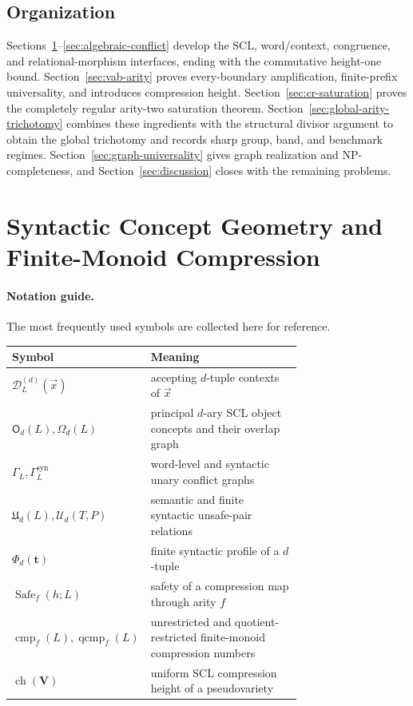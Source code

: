 \documentclass[10pt,a4paper]{article}
\theoremstyle{definition}
\theoremstyle{remark}
\newcommand{\cmp}{\operatorname{cmp}}
\newcommand{\qcmp}{\operatorname{qcmp}}
\newcommand{\D}{\mathcal D}
\newcommand{\Obj}{\mathsf O}
\newcommand{\Om}{\Omega}
\begin{document}
\subsection{Organization}

Sections~\ref{sec:scl-geometry}--\ref{sec:algebraic-conflict} develop the SCL,
word/context, congruence, and relational-morphism interfaces, ending with the
commutative height-one bound.  Section~\ref{sec:vab-arity} proves
every-boundary amplification, finite-prefix universality, and introduces
compression height.  Section~\ref{sec:cr-saturation} proves the completely
regular arity-two saturation theorem.  Section~\ref{sec:global-arity-trichotomy}
combines these ingredients with the structural divisor argument to obtain the
global trichotomy and records sharp group, band, and benchmark regimes.
Section~\ref{sec:graph-universality} gives graph realization and
NP-completeness, and Section~\ref{sec:discussion} closes with the remaining
problems.


\section{Syntactic Concept Geometry and Finite-Monoid Compression}
\label{sec:scl-geometry}

\paragraph{Notation guide.}
The most frequently used symbols are collected here for reference.
\begin{center}
\small
\begin{tabular}{@{}l p{0.72\linewidth}@{}}
\toprule
Symbol & Meaning\\
\midrule
\(\D_L^{(d)}(\vec x)\) & accepting \(d\)-tuple contexts of \(\vec x\)\\
\(\Obj_d(L),\Om_d(L)\) & principal \(d\)-ary SCL object concepts and their overlap graph\\
\(\Gamma_L,\Gamma_L^{\mathrm{syn}}\) & word-level and syntactic unary conflict graphs\\
\(\mathfrak U_d(L),\mathcal U_d(T,P)\) & semantic and finite syntactic unsafe-pair relations\\
\(\Phi_d(\mathbf t)\) & finite syntactic profile of a \(d\)-tuple\\
\(\operatorname{Safe}_f(h;L)\) & safety of a compression map through arity \(f\)\\
\(\cmp_f(L),\qcmp_f(L)\) & unrestricted and quotient-restricted finite-monoid compression numbers\\
\(\operatorname{ch}(\mathbf V)\) & uniform SCL compression height of a pseudovariety\\
\bottomrule
\end{tabular}
\end{center}
\end{document}
